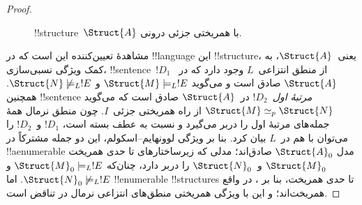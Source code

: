 \documentclass[../../../include/open-logic-section]{subfiles}
\begin{document}
\begin{proof}
\begin{figure}[h]
  \centering
  \caption{!!{structure}~$\Struct{A}$ با همریختی جزئی درونی.}
\end{figure}

مشاهدهٔ تعیین‌کننده این است که در !!{language} این !!{structure}،
یعنی~$\Struct{A}$، به کمک ویژگی نسبی‌سازی، !!{sentence}~$!D_1$ از
منطق انتزاعی~$L$ وجود دارد
که در~$\Struct{A}$ صادق است و می‌گوید
$\Struct{M} \models_L !E$ و $\Struct{N} \not\models_L !E$. همچنین
!!{sentence}
\emph{مرتبهٔ اول}~$!D_2$ در~$\Struct{A}$ صادق است که می‌گوید
$\Struct{M} \simeq_p \Struct{N}$ از راه همریختی جزئی~$I$. چون منطق
نرمال همهٔ جمله‌های مرتبهٔ اول را دربر می‌گیرد و نسبت به عطف بسته است،
$!D_1$ و~$!D_2$ را می‌توان با هم در~$L$ بیان کرد. بنا بر ویژگی
لوونهایم--اسکولم، این دو جمله مشترکاً در !!a{enumerable} مدل
$\Struct{A}_0$ صادق‌اند؛ مدلی که زیرساختارهای تا حدی همریخت
$\Struct{M}_0$ و~$\Struct{N}_0$ را دربر دارد، چنان‌که
$\Struct{M}_0 \models_L !E$ و
$\Struct{N}_0 \not\models_L !E$. اما !!{enumerable} !!{structure}s تا حدی
همریخت، بنا بر
، در واقع همریخت‌اند؛ و این با ویژگی
همریختی منطق‌های انتزاعی نرمال در تناقض است.
\end{proof}
\end{document}
